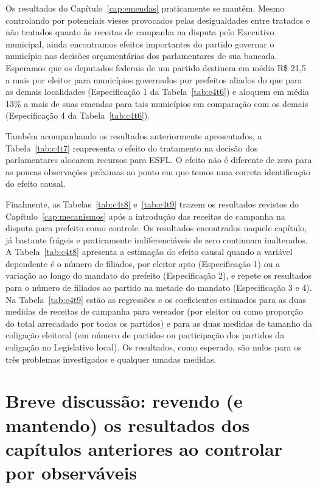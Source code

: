


Os resultados do Capítulo~\ref{cap:emendas} praticamente se mantém. Mesmo controlando por potenciais vieses provocados pelas desigualdades entre tratados e não tratados quanto às receitas de campanha na disputa pelo Executivo municipal, ainda encontramos efeitos importantes do partido governar o município nas decisões orçamentárias dos parlamentares de sua bancada. Esperamos que os deputados federais de um partido destinem em média R\$ 21,5 a mais por eleitor para municípios governados por prefeitos aliados do que para as demais localidades (Especificação 1 da Tabela~\ref{tab:c4t6}) e aloquem em média 13\% a mais de suas emendas para tais municípios em comparação com os demais (Especificação 4 da Tabela~\ref{tab:c4t6}).

Também acompanhando os resultados anteriormente apresentados, a Tabela~\ref{tab:c4t7} reapresenta o efeito do tratamento na decisão dos parlamentares alocarem recursos para ESFL. O efeito não é diferente de zero para as poucas observações próximas ao ponto em que temos uma correta identificação do efeito causal.

Finalmente, as Tabelas~\ref{tab:c4t8} e~\ref{tab:c4t9} trazem os resultados revistos do Capítulo~\ref{cap:mecanismos} após a introdução das receitas de campanha na disputa para prefeito como controle. Os resultados encontrados naquele capítulo, já bastante frágeis e praticamente indiferenciáveis de zero continuam inalterados. A Tabela~\ref{tab:c4t8} apresenta a estimação do efeito causal quando a variável dependente é o número de filiados, por eleitor apto (Especificação 1) ou a variação ao longo do mandato do prefeito (Especificação 2), e repete os resultados para o número de filiados ao partido na metade do mandato (Especificação 3 e 4). Na Tabela~\ref{tab:c4t9} estão as regressões e os coeficientes estimados para as duas medidas de receitas de campanha para vereador (por eleitor ou como proporção do total arrecadado por todos os partidos) e para as duas medidas de tamanho da coligação eleitoral (em número de partidos ou participação dos partidos da coligação no Legislativo local). Os resultados, como esperado, são nulos para os três problemas investigados e qualquer umadas medidas.




\section{Breve discussão: revendo (e mantendo) os resultados dos capítulos anteriores ao controlar por observáveis}


